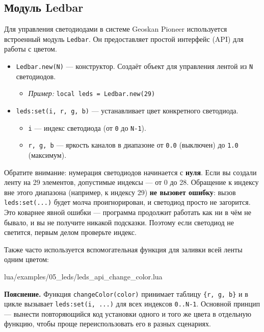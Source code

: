 \subsection{Модуль Ledbar}

Для управления светодиодами в системе Geoskan Pioneer используется встроенный модуль \texttt{Ledbar}. Он предоставляет простой интерфейс (API) для работы с цветом.

\begin{codebox}
\begin{itemize}
  \item \texttt{Ledbar.new(N)} — конструктор. Создаёт объект для управления лентой из \texttt{N} светодиодов.
  \begin{itemize}
      \item \textit{Пример:} \texttt{local leds = Ledbar.new(29)}
  \end{itemize}
  
  \item \texttt{leds:set(i, r, g, b)} — устанавливает цвет конкретного светодиода.
  \begin{itemize}
      \item \texttt{i} — индекс светодиода (от \texttt{0} до \texttt{N-1}).
      \item \texttt{r, g, b} — яркость каналов в диапазоне от \texttt{0.0} (выключен) до \texttt{1.0} (максимум).
  \end{itemize}
\end{itemize}
\end{codebox}

\begin{warnbox}[Индексация]
Обратите внимание: нумерация светодиодов начинается с \textbf{нуля}. Если вы создали ленту на 29 элементов, допустимые индексы — от 0 до 28. Обращение к индексу вне этого диапазона (например, к индексу 29) \textbf{не вызовет ошибку}: вызов \texttt{leds:set(...)} будет молча проигнорирован, и светодиод просто не загорится. Это коварнее явной ошибки — программа продолжит работать как ни в чём не бывало, и вы не получите никакой подсказки. Поэтому если светодиод не светится, первым делом проверьте индекс.
\end{warnbox}

Также часто используется вспомогательная функция для заливки всей ленты одним цветом:
\begin{codebox}
\begin{codefile}{lua/examples/05_leds/leds_api_change_color.lua}
\end{codefile}
\end{codebox}

\textbf{Пояснение.} Функция \verb|changeColor(color)| принимает таблицу \verb|{r, g, b}| и в цикле вызывает \verb|leds:set(i, ...)| для всех индексов \verb|0..N-1|. Основной принцип — вынести повторяющийся код установки одного и того же цвета в отдельную функцию, чтобы проще переиспользовать его в разных сценариях.
